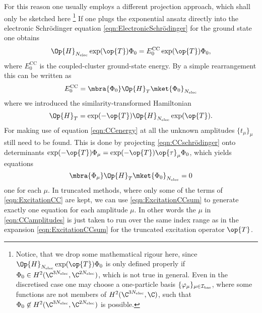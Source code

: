 For this reason one usually employs a different projection approach,
which shall only be sketched here%
\footnote{Notice, that we drop some mathematical rigour here,
	since $\Op{H}_{\Nelec} \exp(\op{T}) \Phi_0$ is only defined properly
	if $\Phi_0 \in H^2(\C^{3\Nelec}, \C^{2\Nelec})$,
	which is not true in general.
	Even in the discretised case one may choose a one-particle basis $\{\varphi_\mu\}_{\mu\in\mathcal{I}_\text{bas}}$,
	where some functions are not members of $H^2(\C^{3\Nelec}, \C)$,
	such that $\Phi_0 \not\in H^2(\C^{3\Nelec}, \C^{2\Nelec})$ is possible.
}
If one plugs the exponential ansatz directly into the electronic Schrödinger equation
\eqref{eqn:ElectronicSchrödinger} for the ground state one obtains
\begin{equation}
	\Op{H}_{\Nelec} \exp(\op{T}) \Phi_0 = E_0^\text{CC} \exp(\op{T}) \Phi_0,
	\label{eqn:CCschrödinger}
\end{equation}
where $E_0^\text{CC}$ is the coupled-cluster ground-state energy.
By a simple rearrangement this can be written as
\begin{equation}
	E_0^\text{CC} = \mbra{\Phi_0} \Op{H}_T \mket{\Phi_0}_{\Nelec}
	\label{eqn:CCenergy}
\end{equation}
where we introduced the similarity-transformed Hamiltonian
\[ \Op{H}_T = \exp(-\op{T}) \Op{H}_{\Nelec} \exp(\op{T}). \]
For making use of equation \eqref{eqn:CCenergy}
at all the unknown amplitudes $\{t_\mu\}_{\mu}$ still need to be found.
This is done by projecting \eqref{eqn:CCschrödinger}
onto determinants $\exp(-\op{T}) \Phi_\mu = \exp(-\op{T}) \op{\tau}_\mu \Phi_0$,
which yields equations
\begin{equation}
	\mbra{\Phi_\mu} \Op{H}_T \mket{\Phi_0}_{\Nelec} = 0
	\label{eqn:CCamplitudes}
\end{equation}
one for each $\mu$.
In truncated \CC methods, where only some of the terms of \eqref{eqn:ExcitationCC} are kept,
we can use \eqref{eqn:ExcitationCCsum} to generate exactly one equation
for each amplitude $\mu$.
In other words the $\mu$ in \eqref{eqn:CCamplitudes} is just taken to run over the same
index range as in the expansion \eqref{eqn:ExcitationCCsum} for the truncated
excitation operator $\op{T}$.

